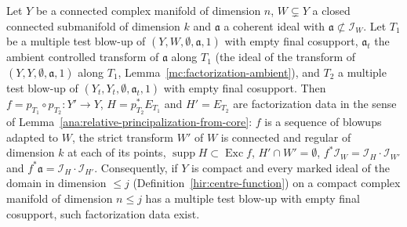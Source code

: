 \begin{theorem}
\label{mc:factorization-assembly}
\leanok
Let \(Y\) be a connected complex manifold of dimension \(n\), \(W\subsetneq Y\) a closed connected submanifold of dimension \(k\) and \(\mathfrak a\) a coherent ideal with
\(\mathfrak a\not\subset\mathcal I_W\). Let \(T_1\) be a multiple test blow-up of \((Y,W,\emptyset,\mathfrak a,1)\) with empty final cosupport, \(\mathfrak a_t\) the ambient controlled
transform of \(\mathfrak a\) along \(T_1\) (the ideal of the transform of \((Y,Y,\emptyset,\mathfrak a,1)\) along \(T_1\), Lemma~\ref{mc:factorization-ambient}), and \(T_2\) a multiple
test blow-up of \((Y_t,Y_t,\emptyset,\mathfrak a_t,1)\) with empty final cosupport. Then \(f=p_{T_1}\circ p_{T_2}\colon Y'\to Y\), \(H=p_{T_2}^*E_{T_1}\) and \(H'=E_{T_2}\) are
factorization data in the sense of Lemma~\ref{ana:relative-principalization-from-core}: \(f\) is a sequence of blowups adapted to \(W\), the strict transform \(W'\) of \(W\) is connected
and regular of dimension \(k\) at each of its points, \(\operatorname{supp}H\subset\operatorname{Exc}f\), \(H'\cap W'=\emptyset\), \(f^*\mathcal I_W=\mathcal I_H\cdot\mathcal I_{W'}\) and
\(f^*\mathfrak a=\mathcal I_H\cdot\mathcal I_{H'}\). Consequently, if \(Y\) is compact and every marked ideal of the domain in dimension \(\le j\) (Definition~\ref{hir:centre-function})
on a compact complex manifold of dimension \(n\le j\) has a multiple test blow-up with empty final cosupport, such factorization data exist.
\end{theorem}
